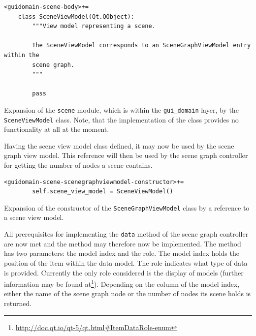 \documentclass[10pt, openright, notitlepage]{scrreprt}
\begin{document}
\begin{listing}[H]
\begin{verbatim}
<guidomain-scene-body>+=
    class SceneViewModel(Qt.QObject):
        """View model representing a scene.
    
        The SceneViewModel corresponds to an SceneGraphViewModel entry within the
        scene graph.
        """
    
        pass
\end{verbatim}
\caption{\label{lst:guidomain-scene-sceneviewmodel}
Expansion of the \texttt{scene} module, which is within the \texttt{gui\_domain} layer, by the \texttt{SceneViewModel} class. Note, that the implementation of the class provides no functionality at all at the moment.}
\end{listing}

Having the scene view model class defined, it may now be used by the scene graph
view model. This reference will then be used by the scene graph controller for
getting the number of nodes a scene contains.

\begin{listing}[H]
\begin{verbatim}
<guidomain-scene-scenegraphviewmodel-constructor>+=
        self.scene_view_model = SceneViewModel()
\end{verbatim}
\caption{\label{lst:guidomain-scene-scenegraphviewmodel-constructor-01}
Expansion of the constructor of the \texttt{SceneGraphViewModel} class by a reference to a scene view model.}
\end{listing}

All prerequisites for implementing the \texttt{data} method of the scene
graph controller are now met and the method may therefore now be implemented.
The method has two parameters: the model index and the role. The model index
holds the position of the item within the data model. The role indicates what
type of data is provided. Currently the only role considered is the display of
models (further information may be found
at\footnote{\url{http://doc.qt.io/qt-5/qt.html\#ItemDataRole-enum}}).
Depending on the column of the model index, either the name of the scene graph
node or the number of nodes its scene holds is returned.
\end{document}
